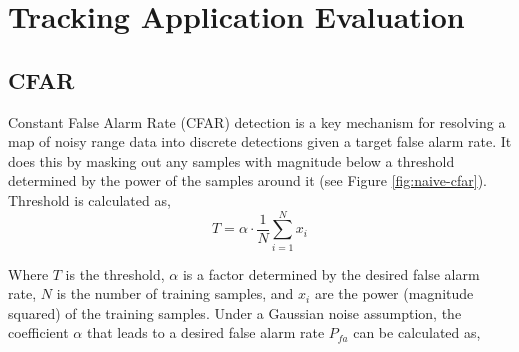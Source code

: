 \section{Tracking Application Evaluation}
\label{sec:tracking_app}
\subsection{CFAR}
Constant False Alarm Rate (CFAR) detection is a key mechanism for resolving a map of noisy range data into discrete detections given a target false alarm rate. It does this by masking out any samples with magnitude below a threshold determined by the power of the samples around it (see Figure \ref{fig:naive-cfar}). Threshold is calculated as,
\begin{equation}
    T = \alpha \cdot \frac{1}{N} \sum_{i=1}^{N} x_i
\end{equation}

Where $T$ is the threshold, $\alpha$ is a factor determined by the desired false alarm rate, $N$ is the number of training samples, and $x_i$ are the power (magnitude squared) of the training samples. Under a Gaussian noise assumption, the coefficient $\alpha$ that leads to a desired false alarm rate $P_{fa}$ can be calculated as, 

